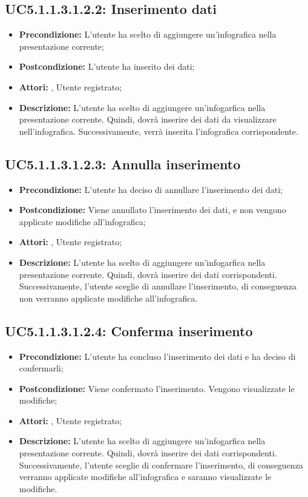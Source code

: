 \subsection{ UC5.1.1.3.1.2.2: Inserimento dati}

\begin{itemize}
	\item \textbf{Precondizione:} L'utente ha scelto di aggiungere un'infografica nella presentazione corrente;
	\item \textbf{Postcondizione:} L'utente ha inserito dei dati;
	\item \textbf{Attori:} , Utente registrato;
	\item \textbf{Descrizione:} L'utente ha scelto di aggiungere un'infogarfica nella presentazione corrente. Quindi, dovrà inserire dei dati da visualizzare nell'infografica. Successivamente, verrà inserita l'infografica corrispondente.
\end{itemize}
\subsection{ UC5.1.1.3.1.2.3: Annulla inserimento}

\begin{itemize}
	\item \textbf{Precondizione:} L'utente ha deciso di annullare l'inserimento dei dati;
	\item \textbf{Postcondizione:} Viene annullato l'inserimento dei dati, e non vengono applicate modifiche all'infografica;
	\item \textbf{Attori:} , Utente registrato;
	\item \textbf{Descrizione:} L'utente ha scelto di aggiungere un'infogarfica nella presentazione corrente. Quindi, dovrà inserire dei dati corrispondenti. Successivamente, l'utente sceglie di annullare l'inserimento, di conseguenza non verranno applicate modifiche all'infografica.
\end{itemize}
\subsection{ UC5.1.1.3.1.2.4: Conferma inserimento}

\begin{itemize}
	\item \textbf{Precondizione:} L'utente ha concluso l'inserimento dei dati e ha deciso di confermarli;
	\item \textbf{Postcondizione:} Viene confermato l'inserimento. Vengono visualizzate le modifiche;
	\item \textbf{Attori:} , Utente registrato;
	\item \textbf{Descrizione:} L'utente ha scelto di aggiungere un'infogarfica nella presentazione corrente. Quindi, dovrà inserire dei dati corrispondenti. Successivamente, l'utente sceglie di confermare l'inserimento, di conseguenza verranno applicate modifiche all'infografica e saranno visualizzate le modifiche.
\end{itemize}
